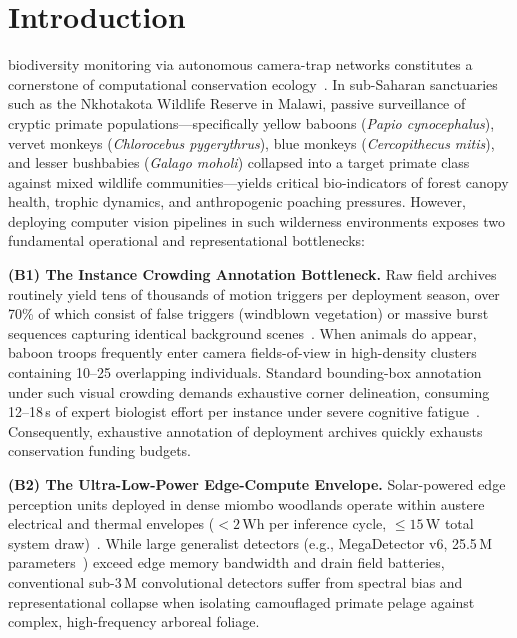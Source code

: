 \documentclass[conference]{IEEEtran}
\begin{document}
\IEEEpeerreviewmaketitle

\section{Introduction}
 biodiversity monitoring via autonomous camera-trap networks constitutes a cornerstone of computational conservation ecology~\cite{wearn2019camera,tuia2022perspectives}. In sub-Saharan sanctuaries such as the Nkhotakota Wildlife Reserve in Malawi, passive surveillance of cryptic primate populations---specifically yellow baboons (\textit{Papio cynocephalus}), vervet monkeys (\textit{Chlorocebus pygerythrus}), blue monkeys (\textit{Cercopithecus mitis}), and lesser bushbabies (\textit{Galago moholi}) collapsed into a target primate class against mixed wildlife communities---yields critical bio-indicators of forest canopy health, trophic dynamics, and anthropogenic poaching pressures. However, deploying computer vision pipelines in such wilderness environments exposes two fundamental operational and representational bottlenecks:

\textbf{(B1) The Instance Crowding Annotation Bottleneck.} Raw field archives routinely yield tens of thousands of motion triggers per deployment season, over 70\% of which consist of false triggers (windblown vegetation) or massive burst sequences capturing identical background scenes~\cite{norouzzadeh2018automatically,beery2019efficient}. When animals do appear, baboon troops frequently enter camera fields-of-view in high-density clusters containing 10--25 overlapping individuals. Standard bounding-box annotation under such visual crowding demands exhaustive corner delineation, consuming 12--18\,s of expert biologist effort per instance under severe cognitive fatigue~\cite{norouzzadeh2021deep,papadopoulos2017training,su2012crowdsourcing}. Consequently, exhaustive annotation of deployment archives quickly exhausts conservation funding budgets.

\textbf{(B2) The Ultra-Low-Power Edge-Compute Envelope.} Solar-powered edge perception units deployed in dense miombo woodlands operate within austere electrical and thermal envelopes ($<2$\,Wh per inference cycle, $\le 15$\,W total system draw)~\cite{tuia2022perspectives,kellenberger2018half}. While large generalist detectors (e.g., MegaDetector v6, 25.5\,M parameters~\cite{beery2019efficient}) exceed edge memory bandwidth and drain field batteries, conventional sub-3\,M convolutional detectors suffer from spectral bias and representational collapse when isolating camouflaged primate pelage against complex, high-frequency arboreal foliage.
\end{document}
